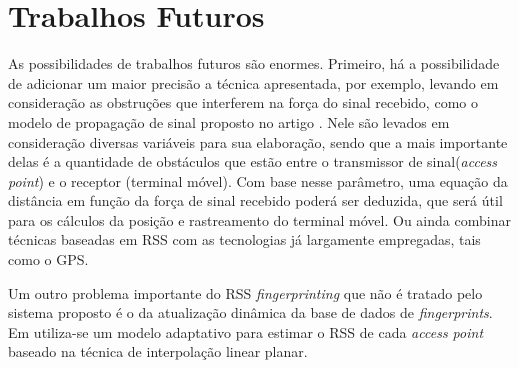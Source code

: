 \section{Trabalhos Futuros}
  As possibilidades de trabalhos futuros são enormes. Primeiro, há a possibilidade de adicionar um maior precisão a técnica 
  apresentada, por exemplo, levando em consideração as obstruções que interferem na força do sinal recebido,
  como o modelo de propagação de sinal proposto no artigo \cite{wifiRadar}. Nele são levados em consideração
  diversas variáveis para sua elaboração, sendo que a mais importante delas é a quantidade de obstáculos que estão 
  entre o transmissor de sinal(\textit{access point}) e o receptor (terminal móvel).
  Com base nesse parâmetro, uma equação da distância em função da força de sinal recebido
  poderá ser deduzida, que será útil para os cálculos da posição e rastreamento
  do terminal móvel. Ou ainda combinar técnicas baseadas em RSS com as tecnologias já largamente empregadas, tais como o GPS.
  
  Um outro problema importante do RSS \textit{fingerprinting} que não é tratado pelo sistema proposto é o da atualização dinâmica da 
  base de dados de \textit{fingerprints}. Em \cite{fingerPrint2} utiliza-se um modelo adaptativo para estimar o 
  RSS de cada \textit{access point} baseado na técnica de interpolação linear planar.
  
